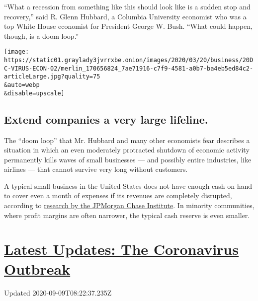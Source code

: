 ``What a recession from something like this should look like is a sudden
stop and recovery,'' said R. Glenn Hubbard, a Columbia University
economist who was a top White House economist for President George W.
Bush. ``What could happen, though, is a doom loop.''

\texttt{[image: https://static01.graylady3jvrrxbe.onion/images/2020/03/20/business/20DC-VIRUS-ECON-02/merlin\_170656824\_7ae71916-c7f9-4581-a0b7-ba4eb5ed84c2-articleLarge.jpg?quality=75\\\&auto=webp\\\&disable=upscale]}

\hypertarget{extend-companies-a-very-large-lifeline}{%
\subsection{Extend companies a very large
lifeline.}\label{extend-companies-a-very-large-lifeline}}

The ``doom loop'' that Mr. Hubbard and many other economists fear
describes a situation in which an even moderately protracted shutdown of
economic activity permanently kills waves of small businesses --- and
possibly entire industries, like airlines --- that cannot survive very
long without customers.

A typical small business in the United States does not have enough cash
on hand to cover even a month of expenses if its revenues are completely
disrupted, according to
\href{https://institute.jpmorganchase.com/content/dam/jpmc/jpmorgan-chase-and-co/institute/pdf/institute-growth-vitality-cash-flows.pdf}{research
by the JPMorgan Chase Institute}. In minority communities, where profit
margins are often narrower, the typical cash reserve is even smaller.

\hypertarget{latest-updates-the-coronavirus-outbreak}{%
\section{\texorpdfstring{\href{https://www.nytimes3xbfgragh.onion/2020/09/08/world/covid-19-coronavirus.html?action=click\&pgtype=Article\&state=default\&region=MAIN_CONTENT_1\&context=storylines_live_updates}{Latest
Updates: The Coronavirus
Outbreak}}{Latest Updates: The Coronavirus Outbreak}}\label{latest-updates-the-coronavirus-outbreak}}

Updated 2020-09-09T08:22:37.235Z

